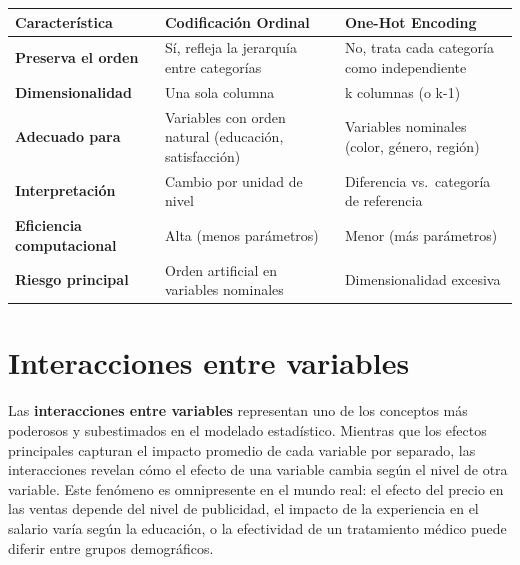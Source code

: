 \documentclass[
  letterpaper,
  DIV=11,
  numbers=noendperiod]{scrreprt}
\begin{document}
\begin{longtable}[]{@{}
  >{\raggedright\arraybackslash}p{}
  >{\raggedright\arraybackslash}p{}
  >{\raggedright\arraybackslash}p{}@{}}
\toprule\noalign{}
\begin{minipage}[b]{\linewidth}\raggedright
\textbf{Característica}
\end{minipage} & \begin{minipage}[b]{\linewidth}\raggedright
\textbf{Codificación Ordinal}
\end{minipage} & \begin{minipage}[b]{\linewidth}\raggedright
\textbf{One-Hot Encoding}
\end{minipage} \\
\midrule\noalign{}
\endhead
\bottomrule\noalign{}
\endlastfoot
\textbf{Preserva el orden} & Sí, refleja la jerarquía entre categorías &
No, trata cada categoría como independiente \\
\textbf{Dimensionalidad} & Una sola columna & k columnas (o k-1) \\
\textbf{Adecuado para} & Variables con orden natural (educación,
satisfacción) & Variables nominales (color, género, región) \\
\textbf{Interpretación} & Cambio por unidad de nivel & Diferencia
vs.~categoría de referencia \\
\textbf{Eficiencia computacional} & Alta (menos parámetros) & Menor (más
parámetros) \\
\textbf{Riesgo principal} & Orden artificial en variables nominales &
Dimensionalidad excesiva \\
\end{longtable}

\section{Interacciones entre
variables}\label{interacciones-entre-variables}

Las \textbf{interacciones entre variables} representan uno de los
conceptos más poderosos y subestimados en el modelado estadístico.
Mientras que los efectos principales capturan el impacto promedio de
cada variable por separado, las interacciones revelan cómo el efecto de
una variable cambia según el nivel de otra variable. Este fenómeno es
omnipresente en el mundo real: el efecto del precio en las ventas
depende del nivel de publicidad, el impacto de la experiencia en el
salario varía según la educación, o la efectividad de un tratamiento
médico puede diferir entre grupos demográficos.
\end{document}
